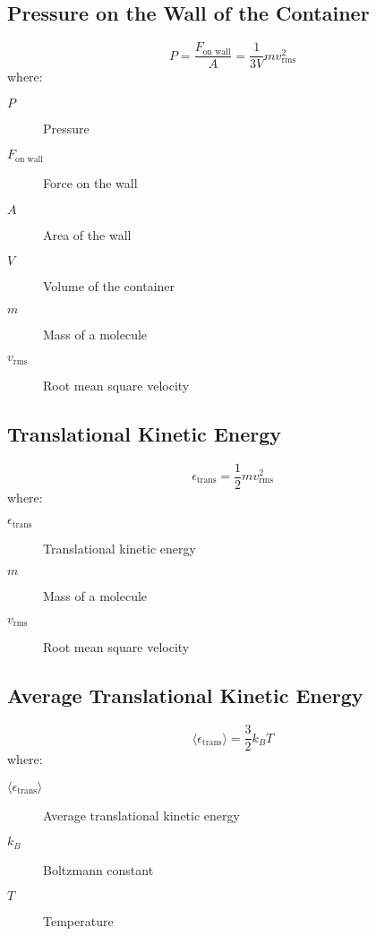 \documentclass{article}
\begin{document}
\subsection*{Pressure on the Wall of the Container}
\begin{equation}
P = \frac{F_{\text{on wall}}}{A} = \frac{1}{3V} m v_{\text{rms}}^2
\end{equation}
where:
\begin{description}
    \item[$P$] Pressure
    \item[$F_{\text{on wall}}$] Force on the wall
    \item[$A$] Area of the wall
    \item[$V$] Volume of the container
    \item[$m$] Mass of a molecule
    \item[$v_{\text{rms}}$] Root mean square velocity
\end{description}

\subsection*{Translational Kinetic Energy}
\begin{equation}
\epsilon_{\text{trans}} = \frac{1}{2} m v_{\text{rms}}^2
\end{equation}
where:
\begin{description}
    \item[$\epsilon_{\text{trans}}$] Translational kinetic energy
    \item[$m$] Mass of a molecule
    \item[$v_{\text{rms}}$] Root mean square velocity
\end{description}

\subsection*{Average Translational Kinetic Energy}
\begin{equation}
\langle \epsilon_{\text{trans}} \rangle = \frac{3}{2} k_B T
\end{equation}
where:
\begin{description}
    \item[$\langle \epsilon_{\text{trans}} \rangle$] Average translational kinetic energy
    \item[$k_B$] Boltzmann constant
    \item[$T$] Temperature
\end{description}
\end{document}
